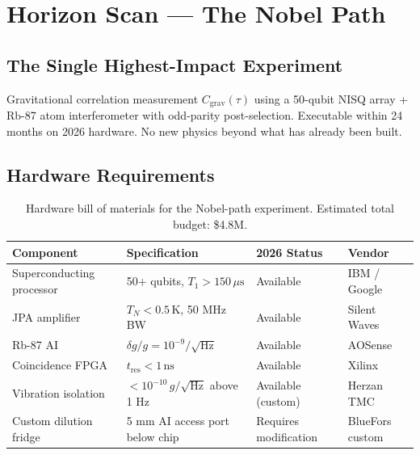 \documentclass[11pt,letterpaper]{article}
\begin{document}
\newpage
\section{Horizon Scan --- The Nobel Path}

\subsection{The Single Highest-Impact Experiment}

\begin{theorembox}
Gravitational correlation measurement $C_{\mathrm{grav}}(\tau)$ using a 50-qubit NISQ array + Rb-87 atom interferometer with odd-parity post-selection. Executable within 24 months on 2026 hardware. No new physics beyond what has already been built.
\end{theorembox}

\subsection{Hardware Requirements}

\begin{table}[h!]
\centering\small
\begin{tabular}{p{2.5cm}p{3cm}p{2.5cm}p{2.5cm}}
\toprule
\textbf{Component} & \textbf{Specification} & \textbf{2026 Status} & \textbf{Vendor} \\
\midrule
Superconducting processor & 50+ qubits, $T_1 > 150\,\mu\text{s}$ & Available & IBM / Google \\
JPA amplifier & $T_N < 0.5\,\text{K}$, 50 MHz BW & Available & Silent Waves \\
Rb-87 AI & $\delta g/g = 10^{-9}/\sqrt{\text{Hz}}$ & Available & AOSense \\
Coincidence FPGA & $t_{\mathrm{res}} < 1\,\text{ns}$ & Available & Xilinx \\
Vibration isolation & $< 10^{-10}\,g/\sqrt{\text{Hz}}$ above 1 Hz & Available (custom) & Herzan TMC \\
Custom dilution fridge & 5 mm AI access port below chip & Requires modification & BlueFors custom \\
\bottomrule
\end{tabular}
\caption{Hardware bill of materials for the Nobel-path experiment. Estimated total budget: \$4.8M.}
\end{table}
\end{document}

